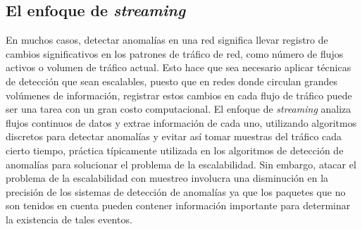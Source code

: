 \documentclass[a4paper,10pt, oneside]{article}
\begin{document}
\subsection{El enfoque de \textit{streaming}}
En muchos casos, detectar anomalías en una red significa llevar registro de cambios significativos en los patrones de tráfico de red, como número de flujos activos o volumen de tráfico actual. Esto hace que sea necesario aplicar técnicas de detección que sean escalables, puesto que en redes donde circulan grandes volúmenes de información, registrar estos cambios en cada flujo de tráfico puede ser una tarea con un gran costo computacional.
El enfoque de \textit{streaming} analiza flujos continuos de datos y extrae información de cada uno, utilizando algoritmos discretos para detectar anomalías\cite{Cormode:2010:ANG:1805876} y evitar así tomar muestras del tráfico cada cierto tiempo, práctica típicamente utilizada en los algoritmos de detección de anomalías para solucionar el problema de la escalabilidad. Sin embargo, atacar el problema de la escalabilidad con muestreo involucra una disminución en la precisión de los sistemas de detección de anomalías ya que los paquetes que no son tenidos en cuenta pueden contener información importante para determinar la existencia de tales eventos.
\end{document}
